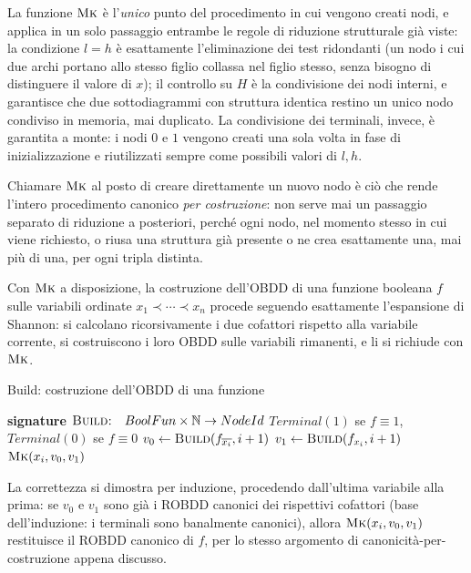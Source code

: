 La funzione \(\textsc{Mk}\) è l'\emph{unico} punto del procedimento in cui vengono creati nodi, e applica in un solo passaggio entrambe le regole di riduzione strutturale già viste: la condizione \(l=h\) è esattamente l'eliminazione dei test ridondanti (un nodo i cui due archi portano allo stesso figlio collassa nel figlio stesso, senza bisogno di distinguere il valore di \(x\)); il controllo su \(H\) è la condivisione dei nodi interni, e garantisce che due sottodiagrammi con struttura identica restino un unico nodo condiviso in memoria, mai duplicato. La condivisione dei terminali, invece, è garantita a monte: i nodi \(0\) e \(1\) vengono creati una sola volta in fase di inizializzazione e riutilizzati sempre come possibili valori di \(l,h\).

\begin{note}{}
  Chiamare \(\textsc{Mk}\) al posto di creare direttamente un nuovo nodo è ciò che rende l'intero procedimento canonico \emph{per costruzione}: non serve mai un passaggio separato di riduzione a posteriori, perché ogni nodo, nel momento stesso in cui viene richiesto, o riusa una struttura già presente o ne crea esattamente una, mai più di una, per ogni tripla distinta.
\end{note}

Con \(\textsc{Mk}\) a disposizione, la costruzione dell'OBDD di una funzione booleana \(f\) sulle variabili ordinate \(x_1 \prec \cdots \prec x_n\) procede seguendo esattamente l'espansione di Shannon: si calcolano ricorsivamente i due cofattori rispetto alla variabile corrente, si costruiscono i loro OBDD sulle variabili rimanenti, e li si richiude con \(\textsc{Mk}\).

\begin{algorithmdesc}{Build: costruzione dell'OBDD di una funzione}
  \begin{algorithmic}[1]
    \Statex{} \textbf{signature} \(\textsc{Build:} \quad BoolFun \times \mathbb{N} \to NodeId\)
    \State{} \Return{} \(Terminal(1)\) se \(f \equiv 1\), \(Terminal(0)\) se \(f \equiv 0\)
    \Else{}
    \State{} \(v_0 \gets \textsc{Build}(f_{\overline{x_i}}, i+1)\)
    \State{} \(v_1 \gets \textsc{Build}(f_{x_i}, i+1)\)
    \State{} \Return{} \(\textsc{Mk}(x_i, v_0, v_1)\)
    \EndIf{}
    \EndFunction{}
  \end{algorithmic}
\end{algorithmdesc}

La correttezza si dimostra per induzione, procedendo dall'ultima variabile alla prima: se \(v_0\) e \(v_1\) sono già i ROBDD canonici dei rispettivi cofattori (base dell'induzione: i terminali sono banalmente canonici), allora \(\textsc{Mk}(x_i,v_0,v_1)\) restituisce il ROBDD canonico di \(f\), per lo stesso argomento di canonicità-per-costruzione appena discusso.

